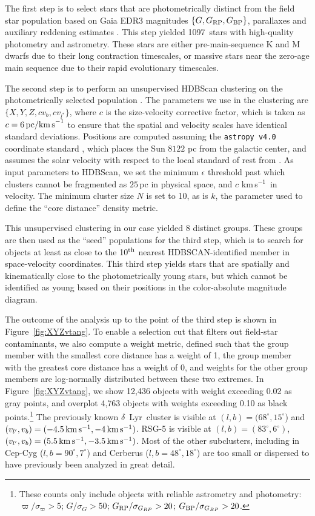 \documentclass[12pt,twocolumn,linenumbers]{aastex63}
\newcommand{\npms}{1097} %
\newcommand{\kms}{\,km\,s$^{-1}$}
\newcommand{\mkms}{{\rm \,km\,s^{-1}}}  %
\begin{document}
The first step is to select stars that are photometrically distinct
from the field star population based on Gaia EDR3 magnitudes $\{G,
G_{\rm RP}, G_{\rm BP}\}$, parallaxes and auxiliary reddening
estimates \citep{lallement_gaia-2mass_2019}.  This step yielded \npms\
stars with high-quality photometry and astrometry.  These stars are
either pre-main-sequence K and M dwarfs due to their long contraction
timescales, or massive stars near the zero-age main sequence due to
their rapid evolutionary timescales.

The second step is to perform an unsupervised HDBScan
clustering on the photometrically selected population
\citep{campello_hierarchical_2015,mcinnes_hdbscan_2017}.  The
parameters we use in the clustering are $\{ X, Y, Z, c v_b,
c v_{l^*} \} $, where $c$ is the size-velocity corrective factor,
which is taken as $c=6\,{\rm pc / km\,s}^{-1}$ to ensure that the
spatial and velocity scales have identical standard deviations.
Positions are computed assuming the \texttt{astropy v4.0} coordinate
standard \citep{astropy_2018}, which places the Sun $8122$ pc from the
galactic center, and assumes the solar velocity with respect to the
local standard of rest from \citet{schonrich_local_2010}.  As input
parameters to HDBScan, we set the minimum $\epsilon$ threshold past
which clusters cannot be fragmented as $25$\,pc in physical space,
and $c$\,\kms\ in velocity.  The minimum cluster size $N$ is set to 10,
as is $k$, the parameter used to define the ``core distance'' density
metric. 

This unsupervised clustering in our case yielded 8 distinct groups.
These groups are then used as the ``seed'' populations for the third
step, which is to search for objects at least as close to the 10$^{\rm
th}$ nearest HDBSCAN-identified member in space-velocity coordinates.
This third step yields stars that are spatially and kinematically
close to the photometrically young stars, but which cannot be
identified as young based on their positions in the color-absolute
magnitude diagram.

The outcome of the analysis up to the point of the third step is shown
in Figure~\ref{fig:XYZvtang}.  To enable a selection cut that filters
out field-star contaminants, we also compute a weight metric, defined
such that the group member with the smallest core distance has a
weight of 1, the group member with the greatest core distance has a
weight of 0, and weights for the other group members are log-normally
distributed between these two extremes.  In Figure~\ref{fig:XYZvtang},
we show 12{,}436 objects with weight exceeding 0.02 as gray points,
and overplot 4{,}763 objects with weights exceeding 0.10 as black
points.\footnote{These counts only include objects with reliable astrometry
	and photometry: $\varpi/\sigma_\varpi>5$;
	$G/\sigma_{G}>50$;
	$G_{\rm RP}/\sigma_{G_{RP}}>20$;
	$G_{\rm BP}/\sigma_{G_{BP}}>20$.}
The previously known $\delta$~Lyr\ cluster is visible at
$(l,b)=(68^\circ,15^\circ$) and
$(v_{l'}, v_b)=(-4.5 \mkms,-4 \mkms)$.  RSG-5 is visible at
$(l,b)=(83^\circ,6^\circ)$,  $(v_{l'}, v_b)=(5.5 \mkms,-3.5 \mkms)$.
Most of the other subclusters, including in Cep-Cyg
($l,b=90^\circ,7^\circ$) and Cerberus ($l,b=48^\circ,18^\circ$) are
too small or dispersed to have previously been analyzed in great
detail.
\end{document}
